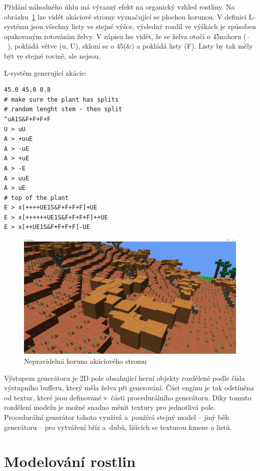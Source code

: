 \documentclass[thesis=M,czech]{FITthesis}[2019/12/23]
\begin{document}
Přidání náhodného úhlu má výrazný efekt na organický vzhled rostliny. Na obrázku~\ref{fig:acacia_random_angle_leaves} lze vidět akáciové stromy vyznačující se plochou korunou. V definici L-systému jsou všechny listy ve stejné výšce, výsledný rozdíl ve výškách je způsoben opakovaným rotováním želvy. V zápisu lze vidět, že se želva otočí o 45\degree nahoru (~$\hat{}$~), pokládá větve (u, U), skloní se o 45\degree (\&) a pokládá listy (F). Listy by tak měly být ve stejné rovině, ale nejsou.

L-systém generující akácie:

\begin{verbatim}
45.0 45.0 0.8
# make sure the plant has splits
# random lenght stem - then split
^uA1S&F+F+F+F
U > uU
A > +uuE
A > -uE
A > +uE
A > -E
A > uuE
A > uE
# top of the plant
E > x[++++UE1S&F+F+F+F]+UE
E > x[++++++UE1S&F+F+F+F]++UE
E > x[++UE1S&F+F+F+F]-UE
\end{verbatim}

\begin{figure}\centering
	\includegraphics[width=\textwidth]{images/acacia_random_angle_leaves}
	\caption[Nepravidelná koruna akáciového stromu]{Nepravidelná koruna akáciového stromu}\label{fig:acacia_random_angle_leaves}
\end{figure}

Výstupem generátoru je 2D pole obsahující herní objekty rozdělené podle čísla výstupního bufferu, který měla želva při generování. Část enginu je tak odstíněna od textur, které jsou definované v~části procedurálního generátoru. Díky tomuto rozdělení modelu je možné snadno měnit textury pro jednotlivá pole. Procedurální generátor tohoto využívá a~používá stejný model -- jiný běh generátoru -- pro vytváření bříz a~dubů, lišících se texturou kmene a listů.

\section{Modelování rostlin}
\end{document}
